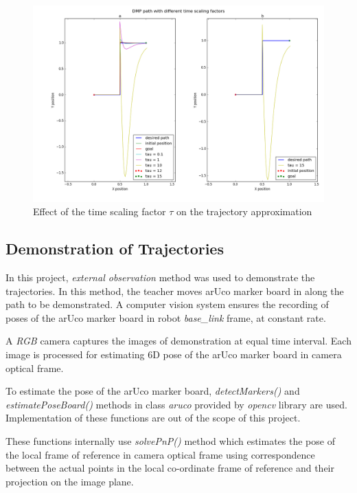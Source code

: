 \begin{figure}[H]
	\includegraphics[width=\textwidth]{images/tau_.png}
	\caption{Effect of the time scaling factor $\tau$ on the trajectory approximation}
	\label{fig:tau_}
\end{figure}






\subsection{Demonstration of Trajectories}

In this project, \textit{external observation} method was used to demonstrate the trajectories. In this method, the teacher moves arUco marker board in along the path to be demonstrated. A computer vision system ensures the recording of poses of the arUco marker board in robot \textit{base\_link} frame, at constant rate. 

A \textit{RGB} camera captures the images of demonstration at equal time interval. Each image is processed for estimating 6D pose of the arUco marker board in camera optical frame. 

To estimate the pose of the arUco marker board, \textit{detectMarkers()} and \textit{estimatePoseBoard()} methods in class \textit{aruco} provided by \textit{opencv} library are used. Implementation of these functions are out of the scope of this project. 

These functions internally use \textit{solvePnP()} method which estimates the pose of the local frame of reference in camera optical frame using correspondence between the actual points in the local co-ordinate frame of reference and their projection on the image plane.  

